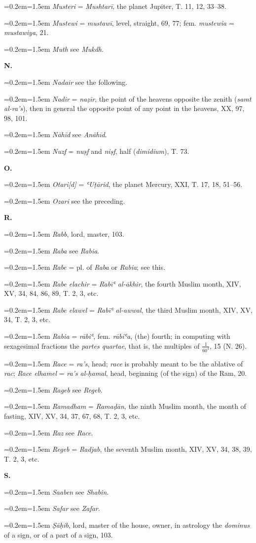 \documentclass[11pt]{article}
\newcommand{\Entry}[1]{\par{\parskip=0.2em\relax\noindent\hangindent=1.5em\hangafter=1 #1\par}}
\begin{document}
\Entry{\emph{Musteri} = \emph{Mushtarī}, the planet Jupiter, T. 11, 12, 33–38.}
\Entry{\emph{Mustewi} = \emph{mustawī}, level, straight, 69, 77; fem. \emph{mustewia} = \emph{mustawiya}, 21.}
\Entry{\emph{Muth} see \emph{Mukdh}.}
\par\begin{center}\textbf{N.}\end{center}
\Entry{\emph{Nadair} see the following.}
\Entry{\emph{Nadir} = \emph{naẓīr}, the point of the heavens opposite the zenith (\emph{samt al-ra’s}), then in general the opposite point of any point in the heavens, XX, 97, 98, 101.}
\Entry{\emph{Nāhīd} see \emph{Anāhīd}.}
\Entry{\emph{Nuzf} = \emph{nuṣf} and \emph{niṣf}, half (\emph{dimidium}), T. 73.}
\par\begin{center}\textbf{O.}\end{center}
\Entry{\emph{Otari[d]} = \emph{ʿUṭārid}, the planet Mercury, XXI, T. 17, 18, 51–56.}
\Entry{\emph{Ozari} see the preceding.}
\par\begin{center}\textbf{R.}\end{center}
\Entry{\emph{Rabb}, lord, master, 103.}
\Entry{\emph{Raba} see \emph{Rabia}.}
\Entry{\emph{Rabe} = pl. of \emph{Raba} or \emph{Rabia}; see this.}
\Entry{\emph{Rabe elachir} = \emph{Rabīʿ al-ākhir}, the fourth Muslim month, XIV, XV, 34, 84, 86, 89, T. 2, 3, etc.}
\Entry{\emph{Rabe elawel} = \emph{Rabīʿ al-awwal}, the third Muslim month, XIV, XV, 34, T. 2, 3, etc.}
\Entry{\emph{Rabia} = \emph{rābiʿ}, fem. \emph{rābiʿa}, (the) fourth; in computing with sexagesimal fractions the \emph{partes quartae}, that is, the multiples of $\tfrac{1}{60^{4}}$, 15 (N. 26).}
\Entry{\emph{Race} = \emph{ra’s}, head; \emph{race} is probably meant to be the ablative of \emph{rac}; \emph{Race elhamel} = \emph{ra’s al-ḥamal}, head, beginning (of the sign) of the Ram, 20.}
\Entry{\emph{Rageb} see \emph{Regeb}.}
\Entry{\emph{Ramadham} = \emph{Ramaḍān}, the ninth Muslim month, the month of fasting, XIV, XV, 34, 37, 67, 68, T. 2, 3, etc.}
\Entry{\emph{Raz} see \emph{Race}.}
\Entry{\emph{Regeb} = \emph{Radjab}, the seventh Muslim month, XIV, XV, 34, 38, 39, T. 2, 3, etc.}
\par\begin{center}\textbf{S.}\end{center}
\Entry{\emph{Saaben} see \emph{Shabin}.}
\Entry{\emph{Safar} see \emph{Zafar}.}
\Entry{\emph{Ṣāḥib}, lord, master of the house, owner, in astrology the \emph{dominus} of a sign, or of a part of a sign, 103.}
\end{document}
